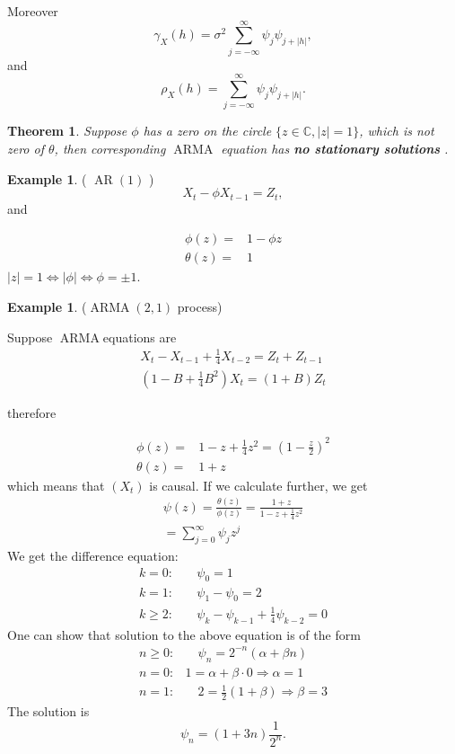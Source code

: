\documentclass[12pt,a4paper, notitlepage]{book}
\theoremstyle{definition} %
\newtheorem{example}[definition]{Example}
\theoremstyle{plain} %
\newtheorem{theorem}[definition]{Theorem}
\newcommand{\C}{\mathbb C}
\DeclareMathOperator{\Arma}{ARMA}
\DeclareMathOperator{\Ar}{AR}
\begin{document}
Moreover 
\[ \gamma _X (h) = \sigma ^2 \sum _{j= - \infty } ^{\infty} \psi _j \psi _{j+|h|} , \]
and 
\[ \rho _X(h) = \sum _{j=-\infty} ^{\infty} \psi _j \psi _{j + |h| } . \]


\endproof


\begin{theorem}
Suppose $ \phi $ has a zero on the circle $ \{ z\in \C , |z | = 1 \} $, which is not zero of $ \theta $, then corresponding $ \Arma $ equation has {\bf no stationary solutions }.
\end{theorem}

\begin{example} ( $ \Ar(1) $ )
\[ X_t - \phi X_{t-1} = Z_t , \]
and 

\begin{align*}
\phi(z)  =& 1 - \phi z \\
\theta(z) =& 1
\end{align*}
$ |z| = 1 \iff | \phi |  \iff \phi = \pm 1 $.
\end{example}


\begin{example} ($\Arma(2,1) $ process)

Suppose $ \Arma $equations are
\begin{align*}
X_t - X_{t-1} + \frac{1}{4} X_{t-2} = Z_t + Z_{t-1} \\
(1 - B + \frac{1}{4} B^2 ) X_t = (1 + B) Z_t 
\end{align*}

therefore

\begin{align*}
\phi(z) = & 1 - z + \frac{1}{4} z^2 = (1 - \frac{z}{2} ) ^2 \\
\theta (z) = & 1 + z
\end{align*}
which means that $ (X_t ) $ is causal. 
If we calculate further, we get
\begin{align*} 
\psi (z) = \frac{\theta(z) } { \phi(z)} = \frac{1+z}{  1 - z + \frac{1}{4} z^2 } \\
= \sum_{j=0} ^{\infty} \psi _j z^j 
\end{align*}
We get the difference equation:
\begin{align*}
k= 0 : & \quad \psi _0 = 1 \\
k=1 : & \quad \psi _1 - \psi _0 = 2 \\
k \geq 2 : & \quad \psi _k - \psi _{k-1} + \frac{1}{4} \psi _{k-2} = 0
\end{align*}
One can show that solution to the above equation is of the form
\begin{align*}
n \geq 0 : & \quad \psi _n = 2^{-n} \left( \alpha + \beta n \right)  \\
n = 0 : & 1 = \alpha + \beta \cdot 0 \Rightarrow \alpha = 1 \\
n = 1 : & \quad 2 = \frac{1}{2} ( 1 + \beta) \Rightarrow \beta = 3 
\end{align*}
The solution is
\[ \psi _n = (1 + 3 n) \frac{1}{2^n} . \]
\end{example}
\end{document}

